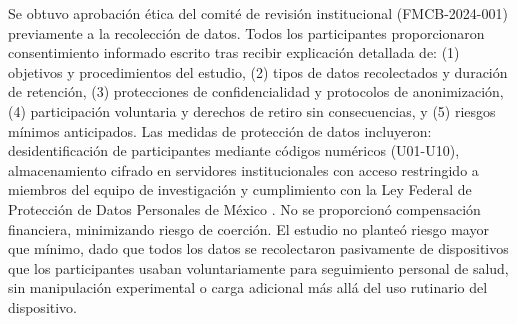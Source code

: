 Se obtuvo aprobación ética del comité de revisión institucional (FMCB-2024-001) previamente a la recolección de datos. Todos los participantes proporcionaron consentimiento informado escrito tras recibir explicación detallada de: (1) objetivos y procedimientos del estudio, (2) tipos de datos recolectados y duración de retención, (3) protecciones de confidencialidad y protocolos de anonimización, (4) participación voluntaria y derechos de retiro sin consecuencias, y (5) riesgos mínimos anticipados. Las medidas de protección de datos incluyeron: desidentificación de participantes mediante códigos numéricos (U01-U10), almacenamiento cifrado en servidores institucionales con acceso restringido a miembros del equipo de investigación y cumplimiento con la Ley Federal de Protección de Datos Personales de México \cite{Liu2022}. No se proporcionó compensación financiera, minimizando riesgo de coerción. El estudio no planteó riesgo mayor que mínimo, dado que todos los datos se recolectaron pasivamente de dispositivos que los participantes usaban voluntariamente para seguimiento personal de salud, sin manipulación experimental o carga adicional más allá del uso rutinario del dispositivo.


%
%
%
%
%

